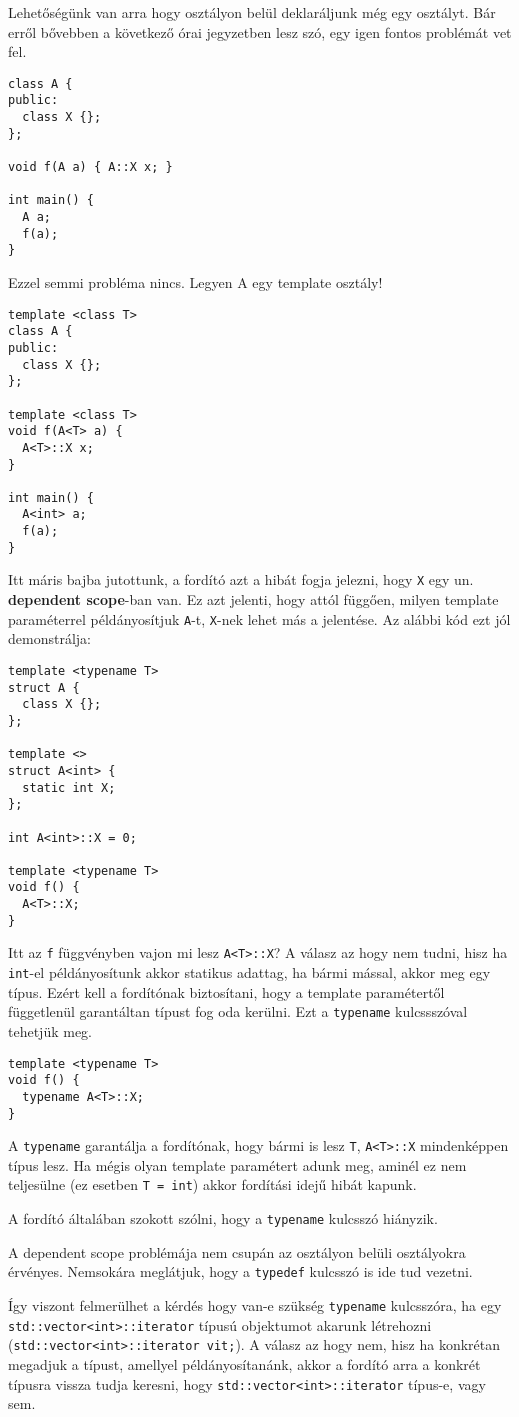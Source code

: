 \documentclass[../cpp_book/cpp_book.tex]{subfiles}
\begin{document}
	Lehetőségünk van arra hogy osztályon belül deklaráljunk még egy osztályt. Bár erről bővebben a következő órai jegyzetben lesz szó, egy igen fontos problémát vet fel.
	\begin{lstlisting}
class A {
public:
  class X {};
};

void f(A a) { A::X x; }

int main() {
  A a;
  f(a);
}
	\end{lstlisting}
	Ezzel semmi probléma nincs. Legyen A egy template osztály!
	\begin{lstlisting}
template <class T>
class A {
public:
  class X {};
};

template <class T>
void f(A<T> a) {
  A<T>::X x;
}

int main() {
  A<int> a;
  f(a);
}
	\end{lstlisting}
	Itt máris bajba jutottunk, a fordító azt a hibát fogja jelezni, hogy \texttt{X} egy un. \textbf{dependent scope}-ban van. Ez azt jelenti, hogy attól függően, milyen template paraméterrel példányosítjuk \texttt{A}-t, \texttt{X}-nek lehet más a jelentése. Az alábbi kód ezt jól demonstrálja:
	\begin{lstlisting}
template <typename T>
struct A {
  class X {};
};

template <>
struct A<int> {
  static int X;
};

int A<int>::X = 0;

template <typename T>
void f() {
  A<T>::X;
}
	\end{lstlisting}
	Itt az \texttt{f} függvényben vajon mi lesz \texttt{A<T>::X}? A válasz az hogy nem tudni, hisz ha \texttt{int}-el példányosítunk akkor statikus adattag, ha bármi mással, akkor meg egy típus. Ezért kell a fordítónak biztosítani, hogy a template paramétertől függetlenül garantáltan típust fog oda kerülni. Ezt a \texttt{typename} kulcssszóval tehetjük meg.
	\begin{lstlisting}
template <typename T>
void f() {
  typename A<T>::X;
}
	\end{lstlisting}
	A \texttt{typename} garantálja a fordítónak, hogy bármi is lesz \texttt{T}, \texttt{A<T>::X} mindenképpen típus lesz. Ha mégis olyan template paramétert adunk meg, aminél ez nem teljesülne (ez esetben \texttt{T = int}) akkor fordítási idejű hibát kapunk.
	\begin{note}
		A fordító általában szokott szólni, hogy a \texttt{typename} kulcsszó hiányzik.
	\end{note}
	\begin{note}
		A dependent scope problémája nem csupán az osztályon belüli osztályokra érvényes. Nemsokára meglátjuk, hogy a \texttt{typedef} kulcsszó is ide tud vezetni.
	\end{note}
	Így viszont felmerülhet a kérdés hogy van-e szükség \texttt{typename} kulcsszóra, ha egy \texttt{std::vector<int>::iterator} típusú objektumot akarunk létrehozni (\texttt{std::vector<int>::iterator vit;}). A válasz az hogy nem, hisz ha konkrétan megadjuk a típust, amellyel példányosítanánk, akkor a fordító arra a konkrét típusra vissza tudja keresni, hogy \texttt{std::vector<int>::iterator} típus-e, vagy sem.
\end{document}
